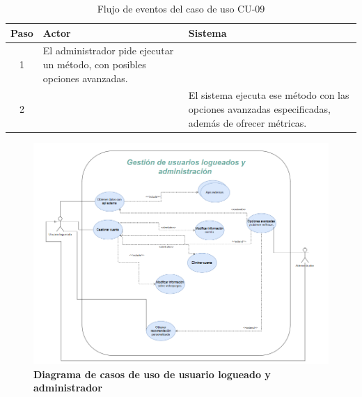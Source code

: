 \begin{table}[H]
\centering
\begin{tabular}{|c|p{5cm}|p{5cm}|}
\hline
\rowcolor{green!40} \textbf{Paso} & \textbf{Actor} & \textbf{Sistema} \\ \hline
\rowcolor{blue!10} 1 & El administrador pide ejecutar un método, con posibles opciones avanzadas. &  \\ \hline
\rowcolor{blue!10} 2 &  & El sistema ejecuta ese método con las opciones avanzadas especificadas, además de ofrecer métricas. \\ \hline
\end{tabular}
\caption{Flujo de eventos del caso de uso CU-09}
\end{table}

\clearpage 

\begin{figure}[H]
    \centering
    \includegraphics[width=1.3\linewidth]{imagenes/cuULYA.png}
    \caption{\textbf{Diagrama de casos de uso de usuario logueado y administrador}}
    \label{casos-de-uso-usuario-logueado}
\end{figure}









